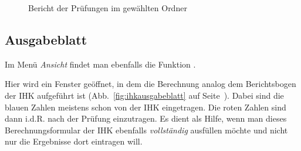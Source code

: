\documentclass[a4paper,notitlepage,parskip=half]{scrartcl}
\begin{document}
\begin{figure}[ht]
  \centering
  \caption{Bericht der Prüfungen im gewählten Ordner}
  \label{fig:bericht}
\end{figure}

\subsection{Ausgabeblatt}
Im Menü \emph{Ansicht} findet man ebenfalls die Funktion .

Hier wird ein Fenster geöffnet, in dem die Berechnung analog dem Berichtsbogen der IHK aufgeführt ist (Abb.~\ref{fig:ihkausgabeblatt} auf Seite~\pageref{fig:ihkausgabeblatt}). Dabei sind die blauen Zahlen meistens schon von der IHK eingetragen. Die roten Zahlen sind dann i.d.R. nach der Prüfung einzutragen. Es dient als Hilfe, wenn man dieses Berechnungsformular der IHK ebenfalls \emph{vollständig} ausfüllen möchte und nicht nur die Ergebnisse dort eintragen will.
\end{document}
